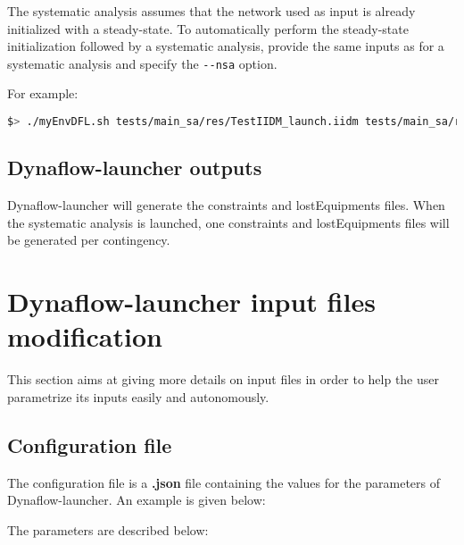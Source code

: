 \documentclass[a4paper, 12pt]{report}
\begin{document}
The systematic analysis assumes that the network used as input is already initialized with a steady-state.
To automatically perform the steady-state initialization followed by a systematic analysis, provide the same inputs as for a systematic analysis and specify the \texttt{-{}-nsa} option.

For example:

\begin{lstlisting}[language=bash, breaklines=true, breakatwhitespace=false, columns=fullflexible]
  $> ./myEnvDFL.sh tests/main_sa/res/TestIIDM_launch.iidm tests/main_sa/res/config_launch.json tests/main_sa/res/contingencies_launch.json --nsa
\end{lstlisting}

\subsection[Dynaflow-launcher outputs]{Dynaflow-launcher outputs}

Dynaflow-launcher will generate the constraints and lostEquipments files.
When the systematic analysis is launched, one constraints and lostEquipments files will be generated per contingency.

\section[Dynaflow-launcher input files modification]{Dynaflow-launcher input files modification}

This section aims at giving more details on input files in order to help the user parametrize its inputs easily and autonomously.

\subsection{Configuration file}
\label{Dynaflow_Launcher_Configuration_Configuration_File}

The configuration file is a \textbf{.json} file containing the values for the parameters of Dynaflow-launcher. An example is given below:



The parameters are described below:
\end{document}
